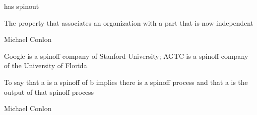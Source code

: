 \documentclass[letterpaper,10pt,english]{sphinxmanual}
\begin{document}
\begin{sphinxShadowBox}

\sphinxAtStartPar
has spinout
\end{sphinxShadowBox}

\begin{sphinxShadowBox}

\sphinxAtStartPar
The property that associates an organization with a part that is now independent
\end{sphinxShadowBox}

\begin{sphinxShadowBox}

\sphinxAtStartPar
Michael Conlon 
\end{sphinxShadowBox}

\begin{sphinxShadowBox}

\sphinxAtStartPar
Google is a spin\sphinxhyphen{}off company of Stanford University; AGTC is a spin\sphinxhyphen{}off company of the University of Florida
\end{sphinxShadowBox}

\begin{sphinxShadowBox}

\sphinxAtStartPar
To say that a is a spin\sphinxhyphen{}off of b implies there is a spin\sphinxhyphen{}off process and that a is the output of that spin\sphinxhyphen{}off process
\end{sphinxShadowBox}

\begin{sphinxShadowBox}

\sphinxAtStartPar
Michael Conlon 
\end{sphinxShadowBox}
\begin{quote}
\label{\detokenize{doc-ORG_2000013:org-2000013}}\label{\detokenize{doc-ORG_2000013:spin-off-organization-of}}\label{\detokenize{doc-ORG_2000013:org-2000013}}
\ignorespaces \end{quote}
\end{document}
